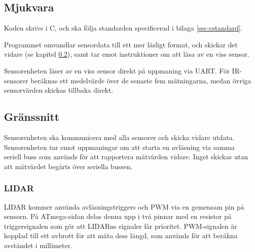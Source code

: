 \documentclass[a4paper,11pt]{article}
\begin{document}
\begin{HardwareList}
\end{HardwareList}

\subsection{Mjukvara}

Koden skrivs i C, och ska följa standarden specificerad i bilaga \ref{sec:cstandard}.

Programmet omvandlar sensordata till ett mer läsligt format, och skickar det vidare (se kapitel \ref{ssec:sensorInterface}), samt tar emot instruktioner om att läsa av en viss sensor. 

Sensorenheten läser av en viss sensor direkt på uppmaning via UART. För IR-sensorer beräknas ett medelvärde över de senaste fem mätningarna, medan övriga sensorvärden skickas tillbaka direkt.

\subsection{Gränssnitt} \label{ssec:sensorInterface}
Sensorenheten ska kommunicera med alla sensorer och skicka vidare utdata. Sensorenheten tar emot uppmaningar om att starta en avläsning via samma seriell buss som används för att rapportera mätvärden vidare. Inget skickas utan att mätvärdet begärts över seriella bussen.

\subsubsection{LIDAR}
LIDAR kommer använda avläsningstriggers och PWM via en gemensam pin på sensorn. På ATmega-sidan delas denna upp i två pinnar med en resistor på triggersignalen som gör att LIDARns signaler får prioritet. PWM-signalen är kopplad till ett avbrott för att mäta dess längd, som används för att beräkna avståndet i millimeter.
\end{document}
